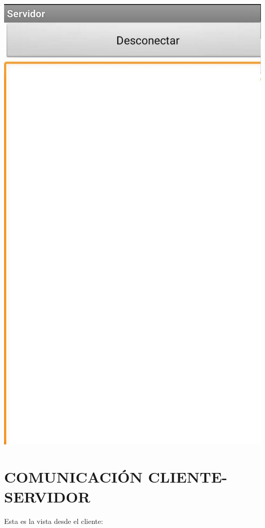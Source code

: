 \documentclass{article}
\begin{document}
\begin{flushleft}
	\includegraphics[scale=0.2]{imagenes/SFallo.jpg} 
\end{flushleft}

\section{COMUNICACIÓN CLIENTE-SERVIDOR}

Esta es la vista desde el cliente:
\end{document}
